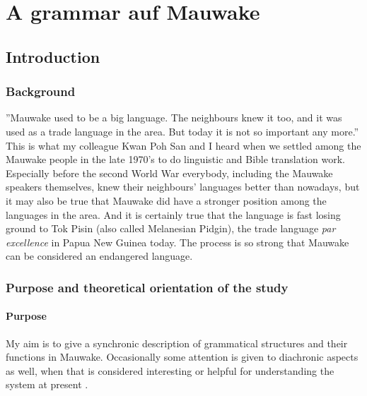 
\chapter{A grammar auf Mauwake}
\section{Introduction}


\subsection{Background}

''Mauwake used to be a big language. The neighbours knew it too, and it was used as a trade language in the area. But today it is not so important any more.'' This is what my colleague Kwan Poh San and I heard when we settled among the Mauwake people in the late 1970's to do linguistic and Bible translation work. Especially before the second World War everybody, including the Mauwake speakers themselves, knew their neighbours' languages better than nowadays, but it may also be true that Mauwake did have a stronger position among the languages in the area. And it is certainly true that the language is fast losing ground to Tok Pisin (also called Melanesian Pidgin), the trade language \textit{par excellence} in Papua New Guinea today.  The process is so strong that Mauwake can be considered an endangered language.

\subsection{Purpose and theoretical orientation of the study}
\subsubsection{Purpose}
My aim is to give a synchronic description of grammatical structures and their functions in Mauwake. Occasionally some attention is given to diachronic aspects as well, when that is considered interesting or helpful for understanding the system at present \citep[20]{EvansEtAl2006}%
. 

